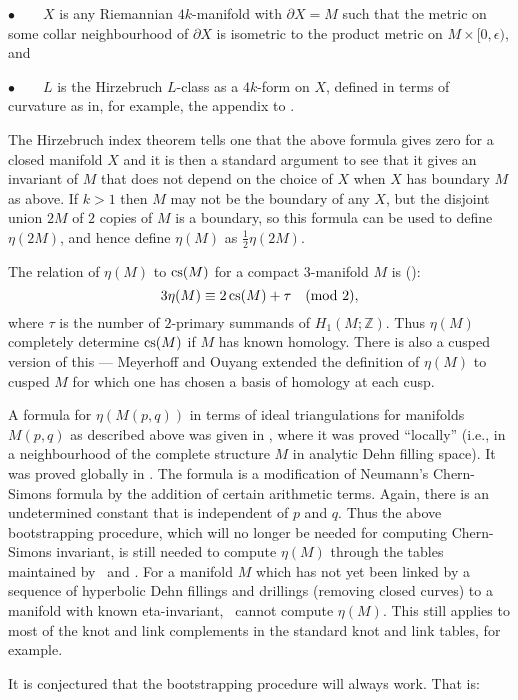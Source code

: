 \documentclass[a4paper]{amsart}
\def\Z{{\mathbb Z}}
\theoremstyle{definition}
\begin{document}
\noindent$\bullet$~~~~$X$ is any Riemannian $4k$-manifold with $\partial X
= M$ such that the metric on some collar neighbourhood of
$\partial X$ is isometric to the product metric on
$M\times[0,\epsilon)$,
and 

\noindent$\bullet$~~~~$L$ is the Hirzebruch $L$-class as a
$4k$-form on $X$, defined in terms of curvature as in, for example,
the appendix to \cite{milnor-stasheff}. 

The Hirzebruch index theorem tells one that the above formula gives
zero for a closed manifold $X$ and it is then a standard argument to
see that it gives an invariant of $M$ that does not depend on the
choice of $X$ when $X$ has boundary $M$ as above.  If $k>1$ then $M$
may not be the boundary of any $X$, but the disjoint union $2M$ of $2$
copies of $M$ is a boundary, so this formula can be used to define
$\eta(2M)$, and hence define $\eta(M)$ as $\frac12\eta(2M)$.

The relation of $\eta(M)$ to $\operatorname{cs}(M)$ for a compact $3$-manifold $M$
is (\cite{atiyah-patodi-singer2}): $$3\eta(M) \equiv
2\operatorname{cs}(M)+\tau\quad\text{(mod $2$)},$$ where $\tau$ is the number of
$2$-primary summands of $H_1(M;\Z)$. Thus $\eta(M)$ completely
determine $\operatorname{cs}(M)$ if $M$ has known homology.  There is also a cusped
version of this --- Meyerhoff and Ouyang \cite{meyerhoff-ouyang}
extended the definition of $\eta(M)$ to cusped $M$ for which one has
chosen a basis of homology at each cusp.

A formula for $\eta(M(p,q))$ in terms of ideal triangulations for
manifolds $M(p,q)$ as described above was given in
\cite{meyerhoff-neumann}, where it was proved ``locally'' (i.e., in a
neighbourhood of the complete structure $M$ in analytic Dehn filling
space). It was proved globally in \cite{ouyang}. The formula is a
modification of Neumann's Chern-Simons formula by the addition of
certain arithmetic terms.  Again, there is an undetermined constant
that is independent of $p$ and $q$.  Thus the above bootstrapping
procedure, which will no longer be needed for computing Chern-Simons
invariant, is still needed to compute $\eta(M)$ through the tables
maintained by \snap\ and \snappea.  For a manifold $M$ which has not
yet been linked by a sequence of hyperbolic Dehn fillings and
drillings (removing closed curves) to a manifold with known
eta-invariant, \snap\ cannot compute $\eta(M)$. This still applies to
most of the knot and link complements in the standard knot and link
tables, for example.

It is conjectured that the bootstrapping procedure will always work.
That is:
\end{document}
